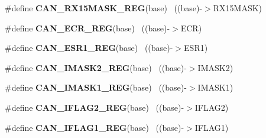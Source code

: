 \begin{DoxyCompactItemize}
\item 
\hypertarget{group___c_a_n___register___accessor___macros_ga005001dc3329b0e1fb9488ebf352e109}{}\#define {\bfseries C\+A\+N\+\_\+\+R\+X15\+M\+A\+S\+K\+\_\+\+R\+E\+G}(base)                                  ~((base)-\/$>$R\+X15\+M\+A\+S\+K)\label{group___c_a_n___register___accessor___macros_ga005001dc3329b0e1fb9488ebf352e109}

\item 
\hypertarget{group___c_a_n___register___accessor___macros_gaea1f06ad20b64003714c92898b52e990}{}\#define {\bfseries C\+A\+N\+\_\+\+E\+C\+R\+\_\+\+R\+E\+G}(base)                                            ~((base)-\/$>$E\+C\+R)\label{group___c_a_n___register___accessor___macros_gaea1f06ad20b64003714c92898b52e990}

\item 
\hypertarget{group___c_a_n___register___accessor___macros_ga1aa0d53df307e5204e551bcd363f01e8}{}\#define {\bfseries C\+A\+N\+\_\+\+E\+S\+R1\+\_\+\+R\+E\+G}(base)                                          ~((base)-\/$>$E\+S\+R1)\label{group___c_a_n___register___accessor___macros_ga1aa0d53df307e5204e551bcd363f01e8}

\item 
\hypertarget{group___c_a_n___register___accessor___macros_gade3a98dd75556ce2b6f1eb832e6e0824}{}\#define {\bfseries C\+A\+N\+\_\+\+I\+M\+A\+S\+K2\+\_\+\+R\+E\+G}(base)                                      ~((base)-\/$>$I\+M\+A\+S\+K2)\label{group___c_a_n___register___accessor___macros_gade3a98dd75556ce2b6f1eb832e6e0824}

\item 
\hypertarget{group___c_a_n___register___accessor___macros_ga80231dca89e90952e2e8e7b3b11da333}{}\#define {\bfseries C\+A\+N\+\_\+\+I\+M\+A\+S\+K1\+\_\+\+R\+E\+G}(base)                                      ~((base)-\/$>$I\+M\+A\+S\+K1)\label{group___c_a_n___register___accessor___macros_ga80231dca89e90952e2e8e7b3b11da333}

\item 
\hypertarget{group___c_a_n___register___accessor___macros_ga3266d1a00bf3a4fc3c464e9992bbd20c}{}\#define {\bfseries C\+A\+N\+\_\+\+I\+F\+L\+A\+G2\+\_\+\+R\+E\+G}(base)                                      ~((base)-\/$>$I\+F\+L\+A\+G2)\label{group___c_a_n___register___accessor___macros_ga3266d1a00bf3a4fc3c464e9992bbd20c}

\item 
\hypertarget{group___c_a_n___register___accessor___macros_ga516d5bdd31eb73adc70fcd9e8db6d6a7}{}\#define {\bfseries C\+A\+N\+\_\+\+I\+F\+L\+A\+G1\+\_\+\+R\+E\+G}(base)                                      ~((base)-\/$>$I\+F\+L\+A\+G1)\label{group___c_a_n___register___accessor___macros_ga516d5bdd31eb73adc70fcd9e8db6d6a7}


\end{DoxyCompactItemize}
